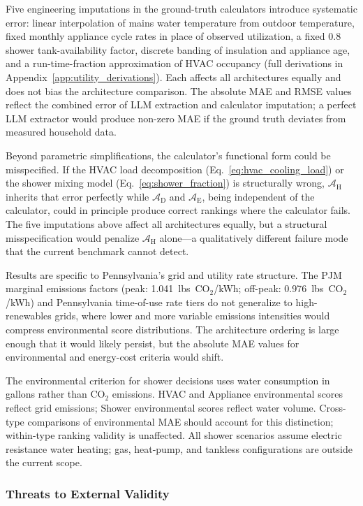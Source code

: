 \documentclass[final,3p,times]{elsarticle}
\begin{document}
Five engineering imputations in the ground-truth calculators introduce systematic error: linear interpolation of mains water temperature from outdoor temperature, fixed monthly appliance cycle rates in place of observed utilization, a fixed 0.8 shower tank-availability factor, discrete banding of insulation and appliance age, and a run-time-fraction approximation of HVAC occupancy (full derivations in Appendix~\ref{app:utility_derivations}). Each affects all architectures equally and does not bias the architecture comparison. The absolute MAE and RMSE values reflect the combined error of LLM extraction and calculator imputation; a perfect LLM extractor would produce non-zero MAE if the ground truth deviates from measured household data.

Beyond parametric simplifications, the calculator's functional form could be misspecified. If the HVAC load decomposition (Eq.~\ref{eq:hvac_cooling_load}) or the shower mixing model (Eq.~\ref{eq:shower_fraction}) is structurally wrong, $\mathcal{A}_{\text{H}}$ inherits that error perfectly while $\mathcal{A}_{\text{D}}$ and $\mathcal{A}_{\text{E}}$, being independent of the calculator, could in principle produce correct rankings where the calculator fails. The five imputations above affect all architectures equally, but a structural misspecification would penalize $\mathcal{A}_{\text{H}}$ alone---a qualitatively different failure mode that the current benchmark cannot detect.

Results are specific to Pennsylvania's grid and utility rate structure. The PJM marginal emissions factors (peak: 1.041~lbs~CO$_2$/kWh; off-peak: 0.976~lbs~CO$_2$/kWh) and Pennsylvania time-of-use rate tiers do not generalize to high-renewables grids, where lower and more variable emissions intensities would compress environmental score distributions. The architecture ordering is large enough that it would likely persist, but the absolute MAE values for environmental and energy-cost criteria would shift.

The environmental criterion for shower decisions uses water consumption in gallons rather than CO$_2$ emissions. HVAC and Appliance environmental scores reflect grid emissions; Shower environmental scores reflect water volume. Cross-type comparisons of environmental MAE should account for this distinction; within-type ranking validity is unaffected. All shower scenarios assume electric resistance water heating; gas, heat-pump, and tankless configurations are outside the current scope.

\subsubsection{Threats to External Validity}
\end{document}
